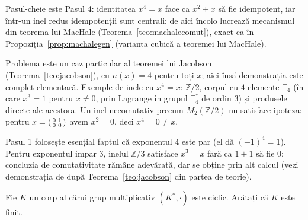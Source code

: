 \begin{obs}
Pasul-cheie este Pasul 4: identitatea $x^{4}=x$ face ca $x^{2}+x$ să fie
idempotent, iar într-un inel redus idempotenții sunt centrali; de aici
încolo lucrează mecanismul din teorema lui MacHale
(Teorema~\ref{teo:machalecomut}), exact ca în Propoziția~\ref{prop:machalegen}
(varianta cubică a teoremei lui MacHale).

Problema este un caz particular al teoremei lui Jacobson
(Teorema~\ref{teo:jacobson}), cu $n(x)=4$ pentru toți $x$; aici însă
demonstrația este complet elementară. Exemple de inele cu $x^{4}=x$:
$\mathbb{Z}/2$, corpul cu $4$ elemente $\mathbb{F}_{4}$ (în care
$x^{3}=1$ pentru $x\neq0$, prin Lagrange în grupul $\mathbb{F}_{4}^{*}$ de
ordin $3$) și produsele directe ale acestora. Un inel necomutativ precum
$M_{2}(\mathbb{Z}/2)$ nu satisface ipoteza: pentru
$x=\begin{psmallmatrix}0&1\\0&0\end{psmallmatrix}$ avem $x^{2}=0$, deci
$x^{4}=0\neq x$.

Pasul 1 folosește esențial faptul că exponentul $4$ este par (el dă
$(-1)^{4}=1$). Pentru exponentul impar $3$, inelul $\mathbb{Z}/3$
satisface $x^{3}=x$ fără ca $1+1$ să fie $0$; concluzia de
comutativitate rămâne adevărată, dar se obține prin alt calcul (vezi demonstrația de după
Teorema~\ref{teo:jacobson} din partea de teorie).
\end{obs}

\begin{problema}
Fie $K$ un corp al cărui grup multiplicativ $(K^*,\cdot)$ este ciclic. Arătați că $K$ este finit.
\end{problema}

